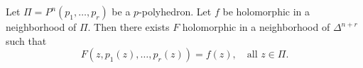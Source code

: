 
Let $\Pi = P^n(p_1, \ldots, p_r)$ be a $p$-polyhedron. Let $f$ be holomorphic in a neighborhood of $\Pi$. Then there exists $F$ holomorphic in a neighborhood of $\Delta^{n+r}$ such that
$$F(z, p_1(z), \ldots, p_r(z)) = f(z), \quad \text{all } z \in \Pi.$$
